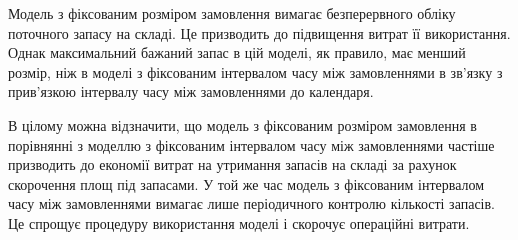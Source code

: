 Модель з фіксованим розміром замовлення вимагає безперервного обліку поточного запасу на складі.
Це призводить до підвищення витрат її використання.
Однак максимальний бажаний запас в цій моделі, як правило, має менший розмір, ніж в моделі з фіксованим інтервалом часу між замовленнями в зв'язку з прив'язкою інтервалу часу між замовленнями до календаря.

В цілому можна відзначити, що модель з фіксованим розміром замовлення в порівнянні з моделлю з фіксованим інтервалом часу між замовленнями частіше призводить до економії витрат на утримання запасів на складі за рахунок скорочення площ під запасами.
У той же час модель з фіксованим інтервалом часу між замовленнями вимагає лише періодичного контролю кількості запасів.
Це спрощує процедуру використання моделі і скорочує операційні витрати.
